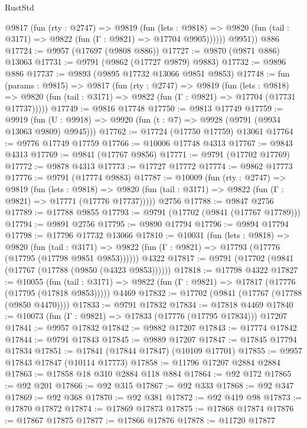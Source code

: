 \begin{lexlean}{RustStd}
\begin{coremodule}
          @9817
            (fun (rty : @2747) =>
            @9819
              (fun (lets : @9818) =>
              @9820 (fun (tail : @3171) => @9822 (fun (Γ : @9821) => @17704 @9905))))))
        @9951))
    @886
@17724 := @9957 (@17697 (@9808 @886))
@17727 := @9870 (@9871 @886) @13063
@17731 := @9791 (@9862 (@17727 @9879) @9883)
@17732 := @9896 @886
@17737 := @9893 (@9895 @17732 @13066 @9851 @9853)
@17748 := fun (params : @9815) =>
  @9817
    (fun (rty : @2747) =>
    @9819
      (fun (lets : @9818) =>
      @9820 (fun (tail : @3171) => @9822 (fun (Γ : @9821) => @17704 (@17731 @17737)))))
@17749 := @9816 @17748
@17750 := @9813 @17749
@17759 := @9919
    (fun (U : @9918) => @9920 (fun (t : @7) => @9928 (@9791 (@9934 @13063 @9809) @9945)))
@17762 := @17724 (@17750 @17759) @13061
@17764 := @9776 @17749 @17759
@17766 := @10006 @17748 @4313
@17767 := @9843 @4313
@17769 := @9841 (@17767 @9856)
@17771 := @9791 (@17702 @17769)
@17772 := @9878 @4313
@17773 := @17727 @17772
@17774 := @9862 @17773
@17776 := @9791 (@17774 @9883)
@17787 := @10009
    (fun (rty : @2747) =>
    @9819
      (fun (lets : @9818) =>
      @9820 (fun (tail : @3171) => @9822 (fun (Γ : @9821) => @17771 (@17776 @17737)))))
    @2756
@17788 := @9847 @2756
@17789 := @17788 @9855
@17793 := @9791 (@17702 (@9841 (@17767 @17789)))
@17794 := @9891 @2756
@17795 := @9890 @17794
@17796 := @9894 @17794
@17798 := @17796 @17732 @13066
@17810 := @10031
    (fun (lets : @9818) =>
    @9820
      (fun (tail : @3171) =>
      @9822 (fun (Γ : @9821) => @17793 (@17776 (@17795 (@17798 @9851 @9853))))))
    @4322
@17817 := @9791 (@17702 (@9841 (@17767 (@17788 (@9850 (@4323 @9853))))))
@17818 := @17798 @4322
@17827 := @10055
    (fun (tail : @3171) => @9822 (fun (Γ : @9821) => @17817 (@17776 (@17795 (@17818 @9853)))))
    @4469
@17832 := @17702 (@9841 (@17767 (@17788 (@9850 @4470))))
@17833 := @9791 @17832
@17834 := @17818 @4469
@17840 := @10073 (fun (Γ : @9821) => @17833 (@17776 (@17795 @17834))) @17207
@17841 := @9957 @17832
@17842 := @9882 @17207
@17843 := @17774 @17842
@17844 := @9791 @17843
@17845 := @9889 @17207
@17847 := @17845 @17794 @17834
@17851 := @17841 (@17844 @17847) (@10109 @17701)
@17855 := @9957 @17843 @17847 (@10114 @17773)
@17858 := @11796 @17207 @2884 @2884
@17863 := @17858 @18 @310 @2884 @118 @884
@17864 := @92 @172
@17865 := @92 @201
@17866 := @92 @315
@17867 := @92 @333
@17868 := @92 @347
@17869 := @92 @368
@17870 := @92 @381
@17872 := @92 @419 @98
@17873 := @17870 @17872
@17874 := @17869 @17873
@17875 := @17868 @17874
@17876 := @17867 @17875
@17877 := @17866 @17876
@17878 := @11720 @17877

\end{coremodule}
\end{lexlean}
